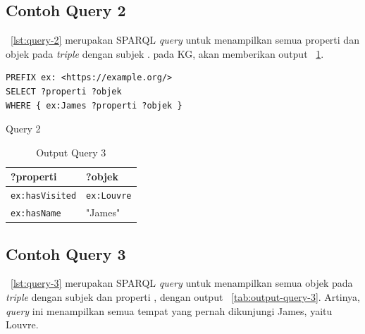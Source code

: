 \subsection{Contoh Query 2}
\label{sec:contoh-query-2}

\lst~\ref{lst:query-2} merupakan SPARQL \textit{query} untuk menampilkan semua properti dan objek
pada \textit{triple} dengan subjek . pada KG, akan memberikan output
\tab~\ref{tab:output-query-2}.

\begin{listing}[H]
  \begin{verbatim}
PREFIX ex: <https://example.org/>
SELECT ?properti ?objek
WHERE { ex:James ?properti ?objek }
  \end{verbatim}
  \caption{Query 2}
  \label{lst:query-2}
\end{listing}

\begin{table}
  \centering
  \begin{tabular}{|l|l|} \hline
    ?properti              & ?objek             \\\hline \hline
    \texttt{ex:hasVisited} & \texttt{ex:Louvre} \\\hline
    \texttt{ex:hasName}    & "James"            \\\hline
  \end{tabular}
  \caption{Output Query 3}
  \label{tab:output-query-2}
\end{table}

\subsection{Contoh Query 3}
\label{sec:contoh-query-3}

\lst~\ref{lst:query-3} merupakan SPARQL \textit{query} untuk menampilkan semua objek pada
\textit{triple} dengan subjek  dan properti , dengan output
\tab~\ref{tab:output-query-3}. Artinya, \textit{query} ini menampilkan semua tempat yang pernah
dikunjungi James, yaitu Louvre.

